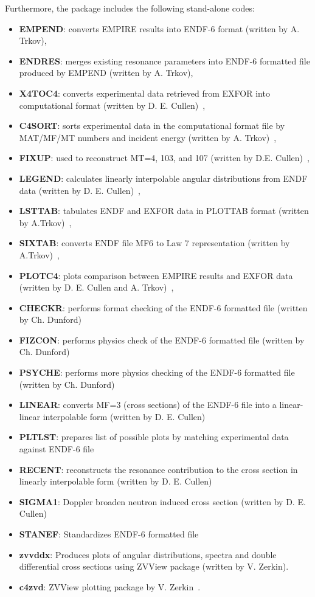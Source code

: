 \documentclass[twocolumn,amsmath,amssymb,10pt,groupedaddress,a4paper]{revtex4}
\begin{document}
 Furthermore, the package
includes the following stand-alone codes:
\begin{itemize}
\item \textbf{EMPEND}: converts EMPIRE results into ENDF-6
format (written by A. Trkov),
\item \textbf{ENDRES}: merges existing resonance parameters
into ENDF-6 formatted file produced by EMPEND (written by A. Trkov),
\item \textbf{X4TOC4}: converts experimental data retrieved
from EXFOR into computational format (written by D. E. Cullen)~\cite{PREPRO},
\item \textbf{C4SORT}: sorts experimental data in the computational
format file by MAT/MF/MT numbers and incident energy (written by A. Trkov)~\cite{ENDVER},
\item \textbf{FIXUP}: used to reconstruct MT=4, 103, and
107 (written by D.E. Cullen)~\cite{PREPRO},
\item \textbf{LEGEND}: calculates linearly interpolable
angular distributions from ENDF data (written by D. E. Cullen)~\cite{PREPRO},
\item \textbf{LSTTAB}: tabulates ENDF and EXFOR data in
PLOTTAB format (written by A.Trkov)~\cite{ENDVER},
\item \textbf{SIXTAB}: converts ENDF file MF6 to Law 7 representation
(written by A.Trkov)~\cite{ENDVER},
\item \textbf{PLOTC4}: plots comparison between EMPIRE results
and EXFOR data (written by D. E. Cullen and A. Trkov)~\cite{ENDVER},
\item \textbf{CHECKR}: performs format checking of the ENDF-6
formatted file (written by Ch. Dunford)
\item \textbf{FIZCON}: performs physics check of the ENDF-6 formatted file
(written by Ch. Dunford)
\item \textbf{PSYCHE}: performs more physics checking of the ENDF-6 formatted
file (written by Ch. Dunford)
\item \textbf{LINEAR}: converts MF=3 (cross sections) of the ENDF-6 file
into a linear-linear interpolable form (written by D. E. Cullen)~\cite{PREPRO}
\item \textbf{PLTLST}: prepares list of possible plots by matching experimental
data against ENDF-6 file
\item \textbf{RECENT}: reconstructs the resonance contribution to the cross
section in linearly interpolable form (written by D. E. Cullen)~\cite{PREPRO}
\item \textbf{SIGMA1}: Doppler broaden neutron induced cross section (written
by D. E. Cullen)~\cite{PREPRO}
\item \textbf{STANEF}: Standardizes ENDF-6 formatted file
\item \textbf{zvvddx}: Produces plots of angular distributions, spectra
and double differential cross sections using ZVView package (written
by V. Zerkin).
\item \textbf{c4zvd}: ZVView\textbf{} plotting package by
V. Zerkin~\cite{ZVView}.
\end{itemize}
\end{document}
